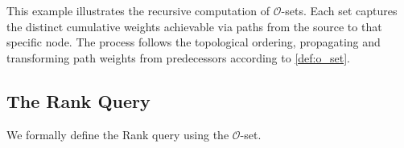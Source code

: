 \begin{example}
\begin{itemize}

    \end{itemize}
    This example illustrates the recursive computation of $\mathcal{O}$-sets. Each set captures the distinct cumulative weights achievable via paths from the source to that specific node. The process follows the topological ordering, propagating and transforming path weights from predecessors according to \ref{def:o_set}.
\end{example}

\subsection{The Rank Query}
\label{subsec:rank_dag_def}

We formally define the Rank query using the $\mathcal{O}$-set.

